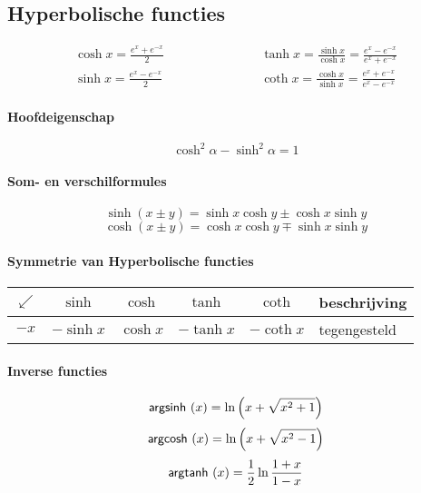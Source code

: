 \subsection{Hyperbolische functies}
\label{sec:HyperbolischeFuncties}
  \begin{eqnarray*}
    \cosh x = \frac{e^x+e^{-x}}{2} & \qquad \qquad \qquad &%
    \tanh x = \frac{\sinh x}{\cosh x} = \frac{e^x-e^{-x}}{e^x+e^{-x}} \\
    \sinh x = \frac{e^x-e^{-x}}{2} & \qquad \qquad \qquad &%
    \coth x = \frac{\cosh x}{\sinh x} = \frac{e^x+e^{-x}}{e^x-e^{-x}}
  \end{eqnarray*}
  
\paragraph{Hoofdeigenschap}
\label{sec:HoofdeigenschapHyperbolisch}
   \[
	   \cosh^2 \alpha - \sinh^2 \alpha = 1
   \]
  
\paragraph{Som- en verschilformules}
\label{sec:SomVerschilHyperbolisch}
   \[
	   \sinh\left( x \pm y \right)  = \sinh x \cosh y \pm \cosh x \sinh y 
   \]
   \[
	   \cosh\left( x \pm y \right)  = \cosh x \cosh y \mp \sinh x \sinh y 
   \]

\paragraph{Symmetrie van Hyperbolische functies}
\label{sec:SymmetrieHyperbolisch}

\begin{center}
	\begin{tabular}{|c||c|c|c|c||l|}
	  \hline
	  $\swarrow$ & $\sinh$ & $\cosh$ & $\tanh$ & $\coth$ & beschrijving\\
	  \hline \hline
	  $- x$ & $-\sinh x$ & $\cosh x$ & $-\tanh x$ & $-\coth x$ & tegengesteld\\
	  \hline
	\end{tabular}
\end{center}

\paragraph{Inverse functies}
\label{sec:invHyperbFunc}
\[
  \mbox{\textsf{argsinh}}\, \left( x \right) = \ln \left( x + \sqrt{x^2+1} \right)
\]
\[
  \mbox{\textsf{argcosh}}\, \left( x \right) = \ln \left( x + \sqrt{x^2-1} \right)
\]
\[
  \mbox{\textsf{argtanh}}\, \left( x \right) = \frac{1}{2} \ln \frac{1+x}{1-x}
\]


